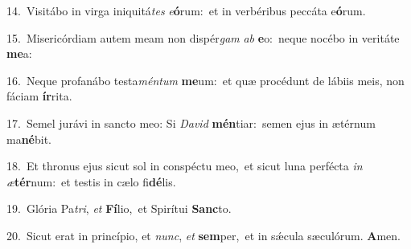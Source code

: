 {\numbfont\textcolor{\numbcolor}{14.}}~Visitábo in virga iniquitá\textit{tes} \textit{e}\-\textbf{ó}rum:~\star et in verbéribus peccáta e\-\textbf{ó}\-rum.\par
{\numbfont\textcolor{\numbcolor}{15.}}~Misericórdiam autem meam non dispér\textit{gam} \textit{ab} \textbf{e}\-o:~\star neque nocébo in veritáte \textbf{me}\-a:\par
{\numbfont\textcolor{\numbcolor}{16.}}~Neque profanábo testa\-\textit{mén}\-\textit{tum} \textbf{me}\-um:~\star et quæ procédunt de lábiis meis, non fáciam \textbf{ír}\-rita.\par
{\numbfont\textcolor{\numbcolor}{17.}}~Semel jurávi in sancto meo: Si \textit{Da}\-\textit{vid} \textbf{mén}\-tiar:~\star semen ejus in ætérnum ma\-\textbf{né}\-bit.\par
{\numbfont\textcolor{\numbcolor}{18.}}~Et thronus ejus sicut sol in conspéctu meo,~\dagger et sicut luna perfécta \textit{in} \textit{æ}\-\textbf{tér}num:~\star et testis in cælo fi\-\textbf{dé}\-lis.\par
{\numbfont\textcolor{\numbcolor}{19.}}~Glória Pa\-\textit{tri}\-, \textit{et} \textbf{Fí}\-lio,~\star et Spirítui \textbf{Sanc}\-to.\par
{\numbfont\textcolor{\numbcolor}{20.}}~Sicut erat in princípio, et \textit{nunc}\-, \textit{et} \textbf{sem}\-per,~\star et in sǽcula sæculórum. \textbf{A}\-men.\par
